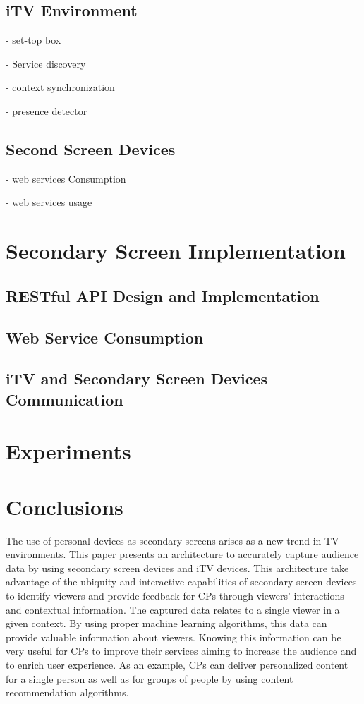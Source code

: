 \documentclass[journal]{IEEEtran}
\begin{document}
\subsection{iTV Environment}

- set-top box

- Service discovery

- context synchronization

- presence detector

\subsection{Second Screen Devices}

- web services Consumption

- web services usage

\section{Secondary Screen Implementation}

\subsection{RESTful API Design and Implementation}

\subsection{Web Service Consumption}

\subsection{iTV and Secondary Screen Devices Communication}

\section{Experiments}

\section{Conclusions}

The use of personal devices as secondary screens arises as a new trend in TV environments. This paper presents an architecture to accurately capture audience data by using secondary screen devices and iTV devices. This architecture take advantage of the ubiquity and interactive capabilities of secondary screen devices to identify viewers and provide feedback for CPs through viewers' interactions and contextual information. The captured data relates to a single viewer in a given context. By using proper machine learning algorithms, this data can provide valuable information about viewers. Knowing this information can be very useful for CPs to improve their services aiming to increase the audience and to enrich user experience. As an example, CPs can deliver personalized content for a single person as well as for groups of people by using content recommendation algorithms.
\end{document}
